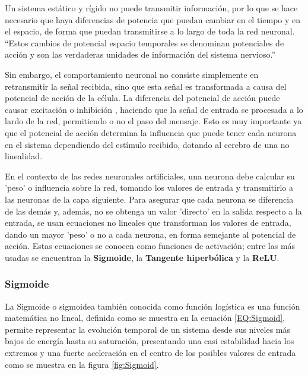         Un sistema estático y rígido no puede transmitir información, por lo que se hace necesario que haya diferencias de potencia que puedan cambiar en el tiempo y en el espacio, de forma que puedan transmitirse a lo largo de toda la red neuronal. ``Estos cambios de potencial espacio temporales se denominan potenciales de acción y son las verdaderas unidades de información del sistema nervioso.'' \cite{Pastor2000Neurons}
        
        Sin embargo, el comportamiento neuronal no consiste simplemente en retransmitir la señal recibida, sino que esta señal es transformada a causa del potencial de acción de la célula. La diferencia del potencial de acción puede causar excitación o inhibición \cite[Pag. 26-27]{tamorri2004neurociencias}, haciendo que la señal de entrada se procesada a lo lardo de la red, permitiendo o no el paso del mensaje. Esto es muy importante ya que el potencial de acción determina la influencia que puede tener cada neurona en el sistema dependiendo del estímulo recibido, dotando al cerebro de una no linealidad.
    
        En el contexto de las redes neuronales artificiales, una neurona debe calcular su 'peso' o influencia sobre la red, tomando los valores de entrada y transmitirlo a las neuronas de la capa siguiente. Para asegurar que cada neurona se diferencia de las demás y, además, no se obtenga un valor 'directo' en la salida respecto a la entrada, se usan ecuaciones no lineales que transforman los valores de entrada, dando un mayor 'peso' o no a cada neurona, en forma semejante al potencial de acción. Estas ecuaciones se conocen como funciones de activación; entre las más usadas se encuentran la \textbf{Sigmoide}, la \textbf{Tangente hiperbólica} y la \textbf{ReLU}.
    
        \subsubsection{Sigmoide}
        \label{sub2:FrameSigmoid}
            La Sigmoide  o sigmoidea también conocida como función logística es una función matemática no lineal, definida como se muestra en la ecuación \ref{EQ:Sigmoid}, permite representar la evolución temporal de un sistema desde sus niveles más bajos de energía hasta su saturación, presentando una casi estabilidad hacia los extremos y una fuerte aceleración en el centro de los posibles valores de entrada como se muestra en la figura \ref{fig:Sigmoid}. 
            
